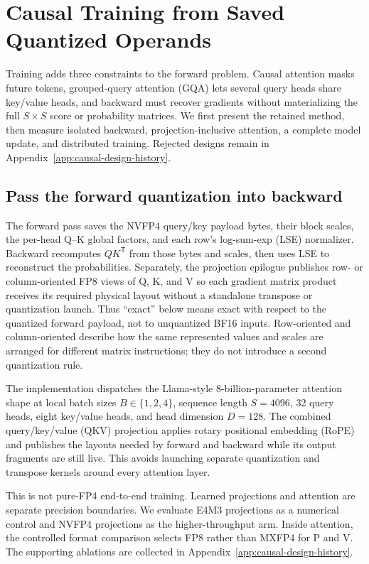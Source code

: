 \FloatBarrier
\section{Causal Training from Saved Quantized Operands}
\label{sec:causal-training}

Training adds three constraints to the forward problem.  Causal attention
masks future tokens, grouped-query attention (GQA) lets several query heads
share key/value heads, and backward must recover gradients without
materializing the full $S\times S$ score or probability matrices.  We first
present the retained method, then measure isolated backward,
projection-inclusive attention, a complete model update, and distributed
training.  Rejected designs remain in
Appendix~\ref{app:causal-design-history}.

\subsection{Pass the forward quantization into backward}

The forward pass saves the NVFP4 query/key payload bytes, their block scales,
the per-head Q--K global factors, and each row's log-sum-exp (LSE)
normalizer.  Backward recomputes $QK^\mathsf{T}$ from those bytes and scales,
then uses LSE to reconstruct the probabilities.  Separately, the projection
epilogue publishes row- or column-oriented FP8 views of Q, K, and V so each
gradient matrix product receives its required physical layout without a
standalone transpose or quantization launch.  Thus ``exact'' below means
exact with respect to the quantized forward payload, not to unquantized BF16
inputs.  Row-oriented and column-oriented describe how the same represented
values and scales are arranged for different matrix instructions; they do not
introduce a second quantization rule.

The implementation dispatches the Llama-style
8-billion-parameter attention shape at local batch sizes
$B\in\{1,2,4\}$, sequence length $S=4096$, 32 query heads, eight key/value
heads, and head dimension $D=128$.
The combined
query/key/value (QKV) projection applies rotary positional embedding (RoPE) and
publishes the layouts needed by forward and backward while its output fragments
are still live.  This avoids launching separate quantization and transpose
kernels around every attention layer.

This is not pure-FP4 end-to-end training.  Learned projections and attention
are separate precision boundaries.  We evaluate E4M3 projections as a
numerical control and NVFP4 projections as the higher-throughput arm.  Inside
attention, the controlled format comparison selects FP8 rather than MXFP4 for
P and V.  The supporting ablations are collected in
Appendix~\ref{app:causal-design-history}.

